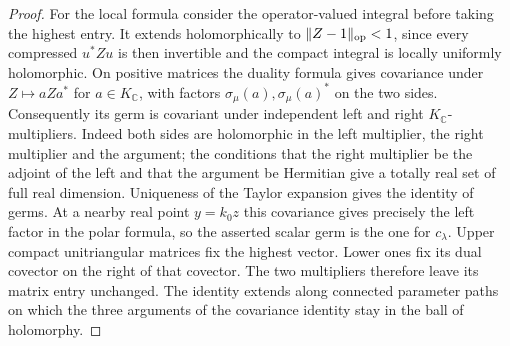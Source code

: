 \documentclass[a4paper,11pt]{article}
\theoremstyle{definition}
\theoremstyle{remark}
\numberwithin{equation}{section}
\begin{document}
\begin{proof}
For the local formula consider the operator-valued integral
before taking the highest entry. It extends holomorphically
to \(\|Z-1\|_{\rm op}<1\), since every compressed
\(u^*Zu\) is then invertible and the compact integral is
locally uniformly holomorphic. On positive matrices the
duality formula gives covariance under \(Z\mapsto aZa^*\)
for \(a\in K_{\mathbb C}\), with factors
\(\sigma_\mu(a),\sigma_\mu(a)^*\) on the two sides.
Consequently its germ is covariant under independent left
and right \(K_{\mathbb C}\)-multipliers. Indeed both sides
are holomorphic in the left multiplier, the right multiplier
and the argument; the conditions that the right multiplier
be the adjoint of the left and that the argument be Hermitian
give a totally real set of full real dimension. Uniqueness
of the Taylor expansion gives the identity of germs.
At a nearby real point \(y=k_0z\) this covariance gives
precisely the left factor in the polar formula, so the
asserted scalar germ is the one for \(c_\lambda\).
Upper compact unitriangular matrices fix the highest vector.
Lower ones fix its dual covector on the right of that
covector. The two multipliers therefore leave its matrix
entry unchanged. The identity extends along connected
parameter paths on which the three arguments of the
covariance identity stay in the ball of holomorphy.
\end{proof}
\end{document}
